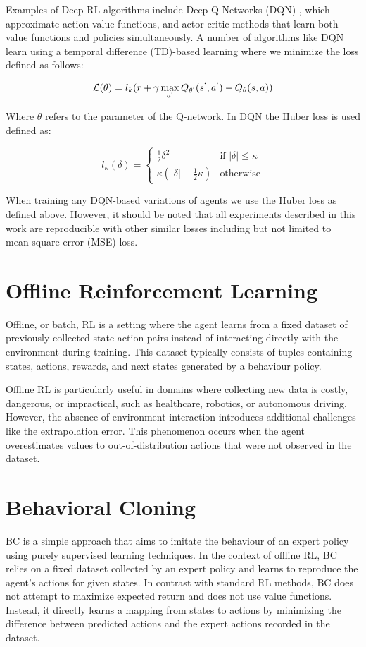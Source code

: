  Examples of Deep RL algorithms include Deep Q-Networks (DQN) \cite{DQN}, which approximate action-value functions, and actor-critic methods that learn both value functions and policies simultaneously. A number of algorithms like DQN learn using a temporal difference (TD)-based learning where we minimize the loss defined as follows:

 $$ \mathcal{L}(\theta) = l_k(r +\gamma \max_{a^`} Q_{\theta^`}(s^`, a^`) - Q_{\theta}(s,a))$$

Where $\theta$ refers to the parameter of the Q-network. In DQN the Huber loss is used defined as:

$$ l_{\kappa}(\delta) =
\begin{cases}
\frac{1}{2}\delta^2 & \text{if } |\delta| \le \kappa \\
\kappa\left(|\delta| - \frac{1}{2}\kappa\right) & \text{otherwise}
\end{cases}$$

When training any DQN-based variations of agents we use the Huber loss as defined above. However, it should be noted that all experiments described in this work are reproducible with other similar losses including but not limited to mean-square error (MSE) loss.

\section{Offline Reinforcement Learning}

Offline, or batch, RL \cite{lange2012batch} is a setting where the agent learns from a fixed dataset of previously collected state-action pairs instead of interacting directly with the environment during training. This dataset typically consists of tuples containing states, actions, rewards, and next states generated by a behaviour policy.

Offline RL is particularly useful in domains where collecting new data is costly, dangerous, or impractical, such as healthcare, robotics, or autonomous driving. However, the absence of environment interaction introduces additional challenges like the extrapolation error. This phenomenon occurs when the agent overestimates values to out-of-distribution actions that were not observed in the dataset.


\section{Behavioral Cloning}

BC is a simple approach that aims to imitate the behaviour of an expert policy using purely supervised learning techniques. In the context of offline RL, BC relies on a fixed dataset collected by an expert policy and learns to reproduce the agent’s actions for given states. In contrast with standard RL methods, BC does not attempt to maximize expected return and does not use value functions. Instead, it directly learns a mapping from states to actions by minimizing the difference between predicted actions and the expert actions recorded in the dataset.


